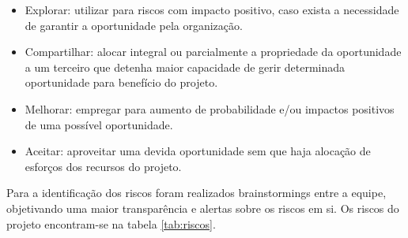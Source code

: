   \begin{itemize}
    \item Explorar: utilizar para riscos com impacto positivo, caso exista a necessidade de garantir a oportunidade pela organização.
    \item Compartilhar: alocar integral ou parcialmente a propriedade da oportunidade a um terceiro que detenha maior
    capacidade de gerir determinada oportunidade para benefício do projeto.
    \item Melhorar: empregar para aumento de probabilidade e/ou impactos positivos de uma possível oportunidade.
    \item Aceitar: aproveitar uma devida oportunidade sem que haja alocação de esforços dos recursos do projeto.
  \end{itemize}

  Para a identificação dos riscos foram realizados brainstormings entre a equipe, objetivando uma maior transparência
  e alertas sobre os riscos em si. Os riscos do projeto encontram-se na tabela \ref{tab:riscos}.

